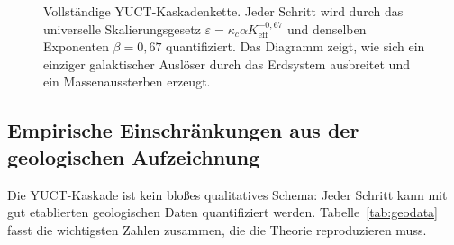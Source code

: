 \documentclass[11pt,a4paper]{article}
\begin{document}
\begin{figure}[p]
{
		}
		\caption{Vollständige YUCT-Kaskadenkette. Jeder Schritt wird durch das universelle
			Skalierungsgesetz \(\varepsilon = \kappa_c \alpha K_{\mathrm{eff}}^{-0,67}\) und denselben Exponenten
			\(\beta = 0,67\) quantifiziert. Das Diagramm zeigt, wie sich ein einziger galaktischer
			Auslöser durch das Erdsystem ausbreitet und ein Massenaussterben erzeugt.}
		\label{fig:yuct_cascade}
	\end{figure}
	
	\subsection{Empirische Einschränkungen aus der geologischen Aufzeichnung}
	
	Die YUCT-Kaskade ist kein bloßes qualitatives Schema: Jeder Schritt kann
	mit gut etablierten geologischen Daten quantifiziert werden. Tabelle~\ref{tab:geodata}
	fasst die wichtigsten Zahlen zusammen, die die Theorie reproduzieren muss.
	
\end{document}
